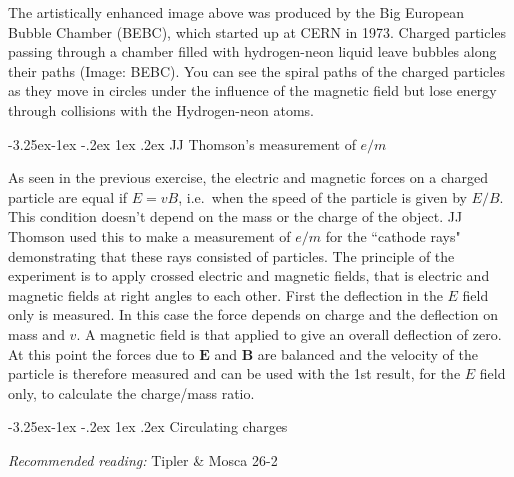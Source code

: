 \documentclass[
]{book}
\makeatletter
\renewcommand\subsection{%
\@startsection{subsection}{2}{\z@}%
              {-3.25ex\@plus -1ex \@minus -.2ex}%
              {1ex \@plus .2ex}%
              {\sffamily\bfseries}}
\numberwithin{equation}{section}
\makeatother
\begin{document}
The artistically enhanced image above was produced by the Big European
Bubble Chamber (BEBC), which started up at CERN in 1973. Charged
particles passing through a chamber filled with hydrogen-neon liquid
leave bubbles along their paths (Image: BEBC). You can see the spiral
paths of the charged particles as they move in circles under the
influence of the magnetic field but lose energy through collisions with
the Hydrogen-neon atoms.

\hypertarget{jj-thomsons-measurement-of-em}{%
\subsection{\texorpdfstring{JJ Thomson's measurement of \(e/m\)}{JJ Thomson's measurement of e/m}}\label{jj-thomsons-measurement-of-em}}

As seen in the previous exercise, the electric and magnetic forces on a
charged particle are equal if \(E = vB\), i.e.~when the speed of the
particle is given by \(E/B\). This condition doesn't depend on the mass or
the charge of the object. JJ Thomson used this to make a measurement of
\(e/m\) for the ``cathode rays" demonstrating that these rays consisted of
particles. The principle of the experiment is to apply crossed electric
and magnetic fields, that is electric and magnetic fields at right
angles to each other. First the deflection in the \(E\) field only is
measured. In this case the force depends on charge and the deflection on
mass and \(v\). A magnetic field is that applied to give an overall
deflection of zero. At this point the forces due to \(\mathbf{E}\) and \(\mathbf{B}\) are
balanced and the velocity of the particle is therefore measured and can
be used with the 1st result, for the \(E\) field only, to calculate the
charge/mass ratio.

\hypertarget{circulating-charges}{%
\subsection{Circulating charges}\label{circulating-charges}}

\emph{Recommended reading:} Tipler \& Mosca 26-2
\end{document}
